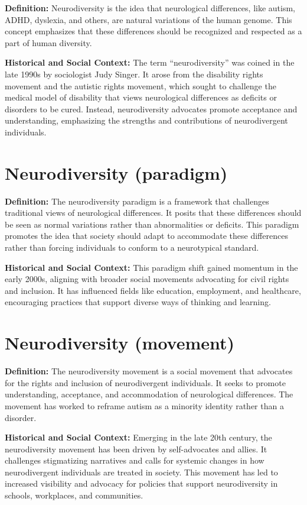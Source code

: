 \documentclass[
  letterpaper,
  DIV=11,
  numbers=noendperiod]{scrreprt}
\begin{document}
\textbf{Definition:} Neurodiversity is the idea that neurological
differences, like autism, ADHD, dyslexia, and others, are natural
variations of the human genome. This concept emphasizes that these
differences should be recognized and respected as a part of human
diversity.

\textbf{Historical and Social Context:} The term ``neurodiversity'' was
coined in the late 1990s by sociologist Judy Singer. It arose from the
disability rights movement and the autistic rights movement, which
sought to challenge the medical model of disability that views
neurological differences as deficits or disorders to be cured. Instead,
neurodiversity advocates promote acceptance and understanding,
emphasizing the strengths and contributions of neurodivergent
individuals.

\section{Neurodiversity (paradigm)}\label{neurodiversity-paradigm}

\textbf{Definition:} The neurodiversity paradigm is a framework that
challenges traditional views of neurological differences. It posits that
these differences should be seen as normal variations rather than
abnormalities or deficits. This paradigm promotes the idea that society
should adapt to accommodate these differences rather than forcing
individuals to conform to a neurotypical standard.

\textbf{Historical and Social Context:} This paradigm shift gained
momentum in the early 2000s, aligning with broader social movements
advocating for civil rights and inclusion. It has influenced fields like
education, employment, and healthcare, encouraging practices that
support diverse ways of thinking and learning.

\section{Neurodiversity (movement)}\label{neurodiversity-movement}

\textbf{Definition:} The neurodiversity movement is a social movement
that advocates for the rights and inclusion of neurodivergent
individuals. It seeks to promote understanding, acceptance, and
accommodation of neurological differences. The movement has worked to
reframe autism as a minority identity rather than a disorder.

\textbf{Historical and Social Context:} Emerging in the late 20th
century, the neurodiversity movement has been driven by self-advocates
and allies. It challenges stigmatizing narratives and calls for systemic
changes in how neurodivergent individuals are treated in society. This
movement has led to increased visibility and advocacy for policies that
support neurodiversity in schools, workplaces, and communities.
\end{document}
